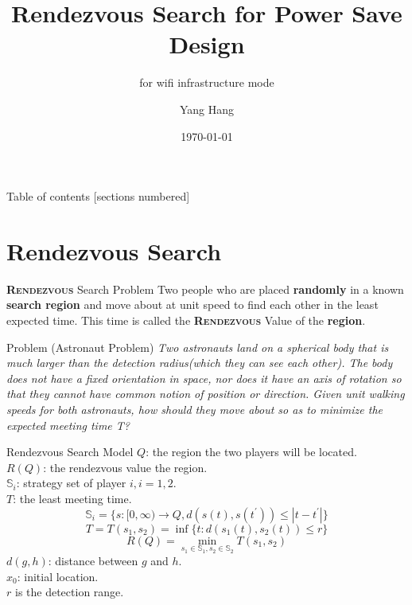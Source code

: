 \documentclass[10pt]{beamer}
\title{Rendezvous Search for Power Save Design}
\subtitle{for wifi infrastructure mode}
\date{\today}
\author{Yang Hang}
\institute{Gratitude Institute of Communication Engineering }
\newcommand{\themename}{\textbf{\textsc{Rendezvous}}\xspace}
\begin{document}
\maketitle

\begin{frame}{Table of contents}
    [sections numbered]
    \tableofcontents[hideallsubsections]
\end{frame}

\section{Rendezvous Search}
\begin{frame}{\themename Search Problem}
    Two people who are placed \textbf{randomly} in a known \textbf{search region} and move about at unit speed to find each other in the least expected time. This time is called the \themename  Value of the \textbf{region}.  

    \alert{Problem (Astronaut Problem)} \textit{Two astronauts land on a spherical body that is much larger than the detection radius(which they can see each other). The body does not have a fixed orientation in space, nor does it have an axis of rotation so that they cannot have common notion of position or direction. Given unit walking speeds for both astronauts, how should they move about so as to minimize the expected meeting time T?}\cite{alpern1995rendezvous}
\end{frame}

\begin{frame}{Rendezvous Search Model}
    $Q$: the region the two players will be located. \\
    $R(Q)$: the rendezvous value the region. \\
    $\mathbb{S}_i $: strategy set of player $i, i = 1,2$. \\
    $T$: the least meeting time. 
    \begin{equation}
        \label{ss} %
        \mathbb{S}_i = \lbrace s: [0, \infty)\rightarrow Q, d(s(t), s(t^\prime)) \leq |t-t^\prime| \rbrace
        \end{equation}
        \begin{equation}
            \label{lmt} %
            T = T(s_1,s_2) = \inf \lbrace t: d(s_1(t), s_2(t)) \leq r \rbrace 
        \end{equation}
        \begin{equation}
            \label{rv} %
            R(Q) = \min_{s_1 \in \mathbb{S}_1, s_2 \in \mathbb{S}_2} {T(s_1, s_2)}
        \end{equation}
        $d(g,h)$: distance between $g$ and $h$.\\
        $x_0$: initial location.\\
        $r$ is the detection range. 
    \end{frame}
\end{document}
